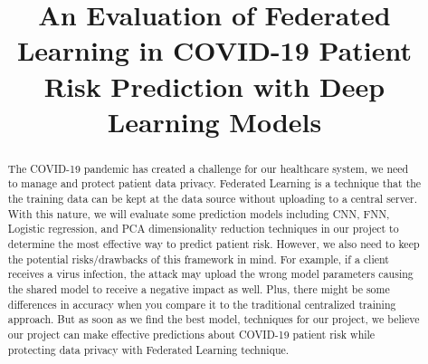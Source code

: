 \documentclass[12pt]{article}
\title{An Evaluation of Federated Learning in COVID-19 Patient Risk Prediction with Deep Learning Models}
\begin{document}
\maketitle

\begin{abstract}
  The COVID-19 pandemic has created a challenge for our healthcare system, we need to manage and protect patient data privacy. Federated Learning is a technique that the the training data can be kept at the data source without uploading to a central server. With this nature, we will evaluate some prediction models including CNN, FNN, Logistic regression, and PCA dimensionality reduction techniques in our project to determine the most effective way to predict patient risk. However, we also need to keep the potential risks/drawbacks of this framework in mind. For example, if a client receives a virus infection, the attack may upload the wrong model parameters causing the shared model to receive a negative impact as well. Plus, there might be some differences in accuracy when you compare it to the traditional centralized training approach. But as soon as we find the best model, techniques for our project, we believe our project can make effective predictions about COVID-19 patient risk while protecting data privacy with Federated Learning technique.
\end{abstract}
\end{document}
